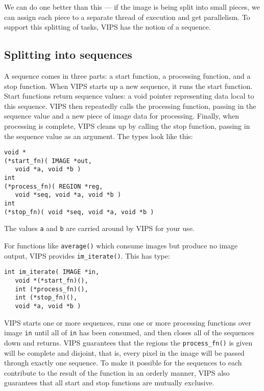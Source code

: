 We can do one better than this --- if the image is being split into small
pieces, we can assign each piece to a separate thread of execution and get
parallelism. To support this splitting of tasks, VIPS has the notion of
a sequence.

\subsection{Splitting into sequences}
\label{sec:sequence}

A sequence comes in three parts: a start function, a processing function,
and a stop function. When VIPS starts up a new sequence, it runs the
start function. Start functions return sequence values: a void pointer
representing data local to this sequence. VIPS then repeatedly calls the
processing function, passing in the sequence value and a new piece of image
data for processing. Finally, when processing is complete, VIPS cleans up by
calling the stop function, passing in the sequence value as an argument. The
types look like this:

\begin{verbatim}
void *
(*start_fn)( IMAGE *out, 
   void *a, void *b )
int 
(*process_fn)( REGION *reg, 
   void *seq, void *a, void *b )
int 
(*stop_fn)( void *seq, void *a, void *b ) 
\end{verbatim}

\noindent
The values \verb+a+ and \verb+b+ are carried around by VIPS for your use.

For functions like \verb+average()+ which consume images but produce no image
output, VIPS provides \verb+im_iterate()+. This has type:

\begin{verbatim}
int im_iterate( IMAGE *in, 
   void *(*start_fn)(), 
   int (*process_fn)(), 
   int (*stop_fn)(),
   void *a, void *b ) 
\end{verbatim}

VIPS starts one or more sequences, runs one or more processing functions
over image \verb+in+ until all of \verb+in+ has been consumed, and then closes
all of the sequences down and returns. VIPS guarantees that the regions
the \verb+process_fn()+ is given will be complete and disjoint, that is,
every pixel in the image will be passed through exactly one sequence. To
make it possible for the sequences to each contribute to the result of the
function in an orderly manner, VIPS also guarantees that all start and stop
functions are mutually exclusive.

